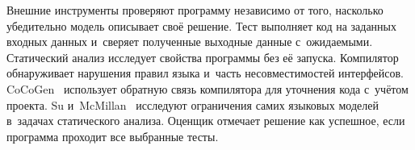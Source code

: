 Внешние инструменты проверяют программу независимо от того, насколько убедительно модель описывает своё решение. Тест выполняет код на заданных входных данных и~сверяет полученные выходные данные с~ожидаемыми. Статический анализ исследует свойства программы без её запуска. Компилятор обнаруживает нарушения правил языка и~часть несовместимостей интерфейсов. CoCoGen~\cite{bi2024cocogen} использует обратную связь компилятора для уточнения кода с~учётом проекта. Su и~McMillan~\cite{su2025static} исследуют ограничения самих языковых моделей в~задачах статического анализа. Оценщик отмечает решение как успешное, если программа проходит все выбранные тесты.
